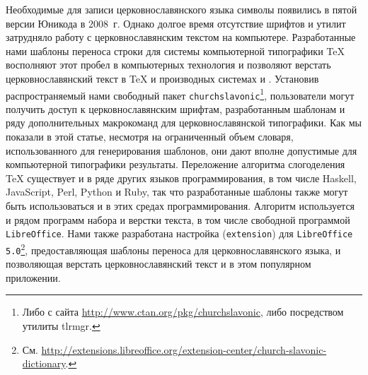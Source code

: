 \documentclass[12pt,a4paper,oneside]{extarticle}
\begin{document}
Необходимые для записи церковнославянского языка символы появились в пятой версии Юникода в 2008~г. Однако долгое время отсутствие шрифтов и утилит затрудняло работу с церковнославянским текстом на компьютере. Разработанные нами шаблоны переноса строки для системы компьютерной типографики \TeX{} восполняют этот пробел в компьютерных технология и позволяют верстать церковнославянский текст в \TeX{} и производных системах \XeTeX{} и \LuaTeX{}. Установив распространяемый нами свободный пакет \verb+churchslavonic+\footnote{Либо с сайта \url{http://www.ctan.org/pkg/churchslavonic}, либо посредством утилиты tlrmgr.}, пользователи могут получить доступ к церковнославянским шрифтам, разработанным шаблонам и ряду дополнительных макрокоманд для церковнославянской типографики. Как мы показали в этой статье, несмотря на ограниченный объем словаря, использованного для генерирования шаблонов, они дают вполне допустимые для компьютерной типографики результаты. Переложение алгоритма слогоделения \TeX{}  существует и в ряде других языков программирования, в том числе Haskell, JavaScript, Perl, Python и Ruby, так что разработанные шаблоны также могут быть использоваться и в этих средах программирования. Алгоритм используется и рядом программ набора и верстки текста, в том числе свободной программой \verb+LibreOffice+. Нами также разработана настройка (\verb+extension+) для \verb+LibreOffice 5.0+\footnote{См. \url{http://extensions.libreoffice.org/extension-center/church-slavonic-dictionary}.}, предоставляющая шаблоны переноса для церковнославянского языка, и позволяющая верстать церковнославянский текст и в этом популярном приложении.

\printbibliography
\end{document}
